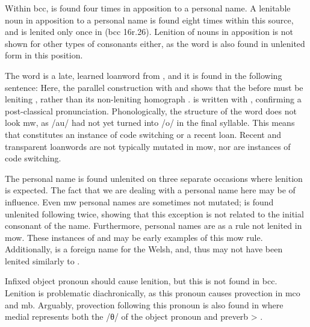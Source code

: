 Within \gls{bcc},  is found four times in apposition to a personal name.
A lenitable noun in apposition to a personal name is found eight times within this source, and is lenited only once in  (\gls{bcc} 16r.26).
Lenition of nouns in apposition is not shown for other types of consonants either, as the word  is also found in unlenited form in this position.

The word  is a late, learned loanword from , and it is found in the following sentence:
Here, the parallel construction with  and  shows that the  before  must be leniting , rather than its non-leniting homograph .
 is written with , confirming a post-classical pronunciation.
Phonologically, the structure of the word does not look \gls{mw}, as /au/ had not yet turned into /o/ in the final syllable.
This means that  constitutes an instance of code switching or a recent loan.
Recent and transparent loanwords are not typically mutated in \gls{mow}, nor are instances of code switching.

The personal name  is found unlenited on three separate occasions where lenition is expected.
The fact that we are dealing with a personal name here may be of influence. Even \gls{mw} personal names are sometimes not mutated;  is found unlenited following  twice, showing that this exception is not related to the initial consonant of the name.
Furthermore, personal names are as a rule not lenited in \gls{mow}.
These instances of  and  may be early examples of this \gls{mow} rule.
Additionally,  is a foreign name for the Welsh, and, thus may not have been lenited similarly to .

Infixed object pronoun  should cause lenition, but this is not found in \gls{bcc}.
Lenition is problematic diachronically, as this pronoun causes provection in \gls{mco} and \gls{mb}.
Arguably, provection following this pronoun is also found in  where medial  represents both the /θ/ of the object pronoun and preverb  > .

